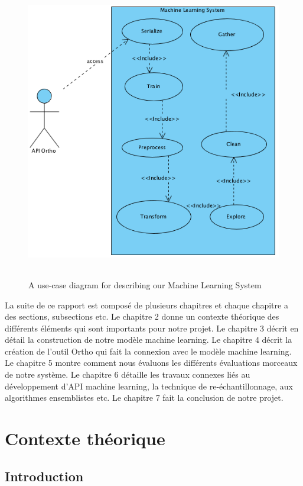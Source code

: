 \documentclass[12pt, french]{report}
\begin{document}
\begin{figure}[h]
	\includegraphics[width=13cm, height =13cm]{images/APIML.png}
	\caption{A use-case diagram for describing our Machine Learning System}
	\label{MLUseCase}
\end{figure} 

La suite de ce rapport est composé de plusieurs chapitres et chaque chapitre a des sections, subsections etc. Le chapitre 2 donne un contexte théorique des différents éléments qui sont importants pour notre projet. Le chapitre 3 décrit en détail la construction de notre modèle machine learning. Le chapitre 4 décrit la création de l'outil Ortho qui fait la connexion avec le modèle machine learning. Le chapitre 5 montre comment nous évaluons les différents évaluations morceaux de notre système. Le chapitre 6 détaille les travaux connexes liés au développement d'API machine learning, la technique de re-échantillonnage, aux algorithmes ensemblistes etc. Le chapitre 7 fait la conclusion de notre projet.


\newpage

\chapter{Contexte théorique}
\section{Introduction}
\end{document}
